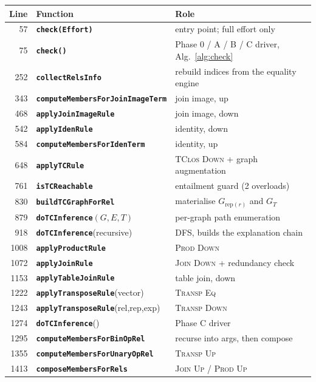 \documentclass[11pt,a4paper]{article}
\newcommand{\fn}[1]{\texttt{\small\bfseries #1}}
\newcommand{\rep}[1]{\mathrm{rep}(#1)}
\theoremstyle{definition}
\begin{document}
\begin{center}\small
\renewcommand{\arraystretch}{1.1}
\begin{longtable}{@{}rlp{9.4cm}@{}}
\toprule
Line & Function & Role\\
\midrule\endhead
57  & \fn{check(Effort)}                    & entry point; full effort only\\
75  & \fn{check()}                          & Phase 0 / A / B / C driver, Alg.~\ref{alg:check}\\
252 & \fn{collectRelsInfo}                  & rebuild indices from the equality engine\\
343 & \fn{computeMembersForJoinImageTerm}   & join image, up\\
468 & \fn{applyJoinImageRule}               & join image, down\\
542 & \fn{applyIdenRule}                    & identity, down\\
584 & \fn{computeMembersForIdenTerm}        & identity, up\\
648 & \fn{applyTCRule}                      & \textsc{TClos Down} + graph augmentation\\
761 & \fn{isTCReachable}                    & entailment guard (2 overloads)\\
830 & \fn{buildTCGraphForRel}               & materialise $G_{\rep r}$ and $G_T$\\
879 & \fn{doTCInference}$(G,E,T)$           & per-graph path enumeration\\
918 & \fn{doTCInference}(recursive)         & DFS, builds the explanation chain\\
1008& \fn{applyProductRule}                 & \textsc{Prod Down}\\
1072& \fn{applyJoinRule}                    & \textsc{Join Down} + redundancy check\\
1153& \fn{applyTableJoinRule}               & table join, down\\
1222& \fn{applyTransposeRule}(vector)       & \textsc{Transp Eq}\\
1243& \fn{applyTransposeRule}(rel,rep,exp)  & \textsc{Transp Down}\\
1274& \fn{doTCInference}()                  & Phase C driver\\
1295& \fn{computeMembersForBinOpRel}        & recurse into args, then compose\\
1355& \fn{computeMembersForUnaryOpRel}      & \textsc{Transp Up}\\
1413& \fn{composeMembersForRels}            & \textsc{Join Up} / \textsc{Prod Up}\\

\end{longtable}
\end{center}
\end{document}
